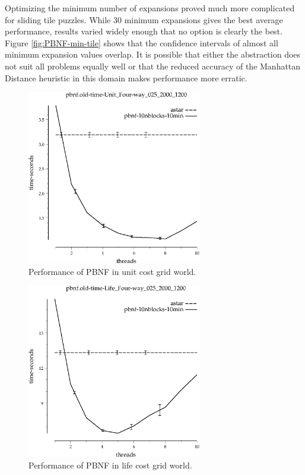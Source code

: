 \documentclass{article}
\begin{document}
Optimizing the minimum number of expansions proved much more complicated for sliding tile puzzles. While 30 minimum expansions gives the best average performance, results varied widely enough that no option is clearly the best. Figure \ref{fig:PBNF-min-tile} shows that the confidence intervals of almost all minimum expansion values overlap. It is possible that either the abstraction does not suit all problems equally well or that the reduced accuracy of the Manhattan Distance heuristic in this domain makes performance more erratic.

\begin{figure}[h!]
\includegraphics[width=3in]{../graphs/seth/grid-unit-single/PBNF.eps}
\caption{Performance of PBNF in unit cost grid world.}
\label{fig:PBNF-grid}
\end{figure}

\begin{figure}[h!]
\includegraphics[width=3in]{../graphs/seth/grid-life-single/PBNF.eps}
\caption{Performance of PBNF in life cost grid world.}
\label{fig:PBNF-life}
\end{figure}
\end{document}
